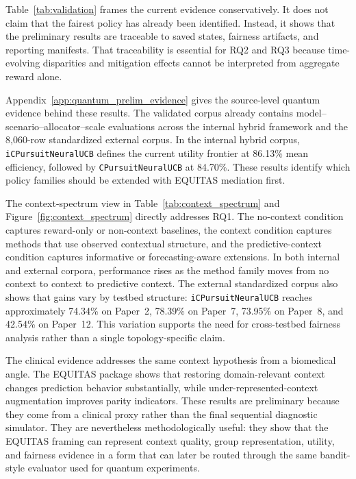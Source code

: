 \documentclass[conference]{IEEEtran}
\begin{document}
Table~\ref{tab:validation} frames the current evidence conservatively. It does
not claim that the fairest policy has already been identified. Instead, it
shows that the preliminary results are traceable to saved states, fairness
artifacts, and reporting manifests. That traceability is essential for RQ2 and
RQ3 because time-evolving disparities and mitigation effects cannot be
interpreted from aggregate reward alone.

Appendix~\ref{app:quantum_prelim_evidence} gives the source-level quantum
evidence behind these results. The validated corpus already contains
model--scenario--allocator--scale evaluations across the internal hybrid
framework and the 8,060-row standardized external corpus. In the internal
hybrid corpus, \texttt{iCPursuitNeuralUCB} defines the current utility
frontier at 86.13\% mean efficiency, followed by
\texttt{CPursuitNeuralUCB} at 84.70\%. These results identify which policy
families should be extended with EQUITAS mediation first.

The context-spectrum view in Table~\ref{tab:context_spectrum} and
Figure~\ref{fig:context_spectrum} directly addresses RQ1. The no-context
condition captures reward-only or non-context baselines, the context condition
captures methods that use observed contextual structure, and the
predictive-context condition captures informative or forecasting-aware
extensions. In both internal and external corpora, performance rises as the
method family moves from no context to context to predictive context. The
external standardized corpus also shows that gains vary by testbed structure:
\texttt{iCPursuitNeuralUCB} reaches approximately 74.34\% on Paper~2, 78.39\%
on Paper~7, 73.95\% on Paper~8, and 42.54\% on Paper~12. This variation
supports the need for cross-testbed fairness analysis rather than a single
topology-specific claim.

The clinical evidence addresses the same context hypothesis from a biomedical
angle. The EQUITAS package shows that restoring domain-relevant context changes
prediction behavior substantially, while under-represented-context
augmentation improves parity indicators. These results are preliminary because
they come from a clinical proxy rather than the final sequential diagnostic
simulator. They are nevertheless methodologically useful: they show that the
EQUITAS framing can represent context quality, group representation, utility,
and fairness evidence in a form that can later be routed through the same
bandit-style evaluator used for quantum experiments.
\end{document}
